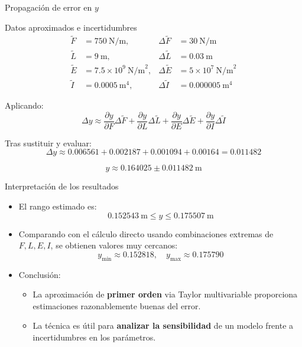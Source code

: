 \documentclass[main.tex]{subfiles}
\begin{document}
\begin{frame}{Propagación de error en $y$}
\small
\begin{block}{Datos aproximados e incertidumbres}
\[
\begin{aligned}
\tilde{F} &= 750\ \text{N/m}, & \Delta\tilde{F} &= 30\ \text{N/m} \\
\tilde{L} &= 9\ \text{m},      & \Delta\tilde{L} &= 0.03\ \text{m} \\
\tilde{E} &= 7.5\times 10^{9}\ \text{N/m}^2, & \Delta\tilde{E} &= 5\times 10^{7}\ \text{N/m}^2 \\
\tilde{I} &= 0.0005\ \text{m}^4, & \Delta\tilde{I} &= 0.000005\ \text{m}^4
\end{aligned}
\]
\end{block}

Aplicando:
\[
\Delta y \approx 
\frac{\partial y}{\partial F}\Delta\tilde{F} +
\frac{\partial y}{\partial L}\Delta\tilde{L} +
\frac{\partial y}{\partial E}\Delta\tilde{E} +
\frac{\partial y}{\partial I}\Delta\tilde{I}
\]

Tras sustituir y evaluar:
\[
\Delta y \approx 0.006561 + 0.002187 + 0.001094 + 0.00164 = 0.011482
\]

\[
y \approx 0.164025 \pm 0.011482\ \text{m}
\]
\end{frame}
\begin{frame}{Interpretación de los resultados}
\small
\begin{itemize}
  \item El rango estimado es:
  \[
    0.152543\ \text{m} \le y \le 0.175507\ \text{m}
  \]
  \item Comparando con el cálculo directo usando combinaciones extremas de
        \(F,L,E,I\), se obtienen valores muy cercanos:
  \[
    y_{\min} \approx 0.152818,\quad y_{\max} \approx 0.175790
  \]
  \item Conclusión:
  \begin{itemize}
    \item La aproximación de \textbf{primer orden} via Taylor multivariable
          proporciona estimaciones razonablemente buenas del error.
    \item La técnica es útil para \textbf{analizar la sensibilidad} de un modelo
          frente a incertidumbres en los parámetros.
  \end{itemize}
\end{itemize}
\end{frame}
\end{document}
